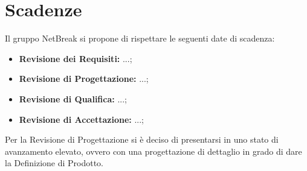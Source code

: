 \newpage
\section{Scadenze}
Il gruppo NetBreak si propone di rispettare le seguenti date di scadenza:
\begin{itemize}
	\item \textbf{Revisione dei Requisiti:} ...;
	\item \textbf{Revisione di Progettazione:} ...;
	\item \textbf{Revisione di Qualifica:} ...;
	\item \textbf{Revisione di Accettazione:} ...;
\end{itemize}
Per la Revisione di Progettazione si è deciso di presentarsi in uno stato di avanzamento elevato, ovvero con una progettazione di dettaglio in grado di dare la Definizione di Prodotto.